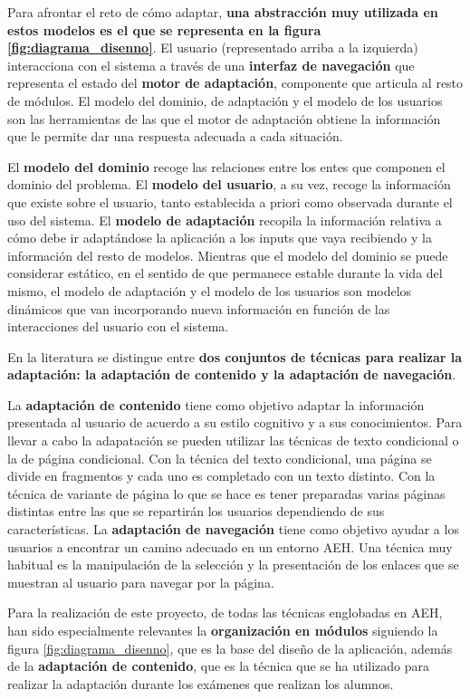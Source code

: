 Para afrontar el reto de cómo adaptar, \textbf{una abstracción muy utilizada en estos modelos es el que se representa en la figura \ref{fig:diagrama_disenno}}. El usuario (representado arriba a la izquierda) interacciona con el sistema a través de una \textbf{interfaz de navegación} que representa el estado del \textbf{motor de adaptación}, componente que articula al resto de módulos. El modelo del dominio, de adaptación y el modelo de los usuarios son las herramientas de las que el motor de adaptación obtiene la información que le permite dar una respuesta adecuada a cada situación. 

El \textbf{modelo del dominio} recoge las relaciones entre los entes que componen el dominio del problema. El \textbf{modelo del usuario}, a su vez, recoge la información que existe sobre el usuario, tanto establecida a priori como observada durante el uso del sistema. El \textbf{modelo de adaptación} recopila la información relativa a cómo debe ir adaptándose la aplicación a los inputs que vaya recibiendo y la información del resto de modelos. Mientras que el modelo del dominio se puede considerar estático, en el sentido de que permanece estable durante la vida del mismo, el modelo de adaptación y el modelo de los usuarios son modelos dinámicos que van incorporando nueva información en función de las interacciones del usuario con el sistema\cite{Benyon93}.

En la literatura se distingue entre \textbf{dos conjuntos de técnicas para realizar la adaptación: la adaptación de contenido y la adaptación de navegación}\cite{Brusilovsky98}. 

La \textbf{adaptación de contenido} tiene como objetivo adaptar la información presentada al usuario de acuerdo a su estilo cognitivo y a sus conocimientos. Para llevar a cabo la adapatación se pueden utilizar las técnicas de texto condicional o la de página condicional. Con la técnica del texto condicional, una página se divide en fragmentos y cada uno es completado con un texto distinto. Con la técnica de variante de página lo que se hace es tener preparadas varias páginas distintas entre las que se repartirán los usuarios dependiendo de sus características. La \textbf{adaptación de navegación} tiene como objetivo ayudar a los usuarios a encontrar un camino adecuado en un entorno \acrshort{AEH}. Una técnica muy habitual es la manipulación de la selección y la presentación de los enlaces que se muestran al usuario para navegar por la página\cite{Triantafillou03}.

Para la realización de este proyecto, de todas las técnicas englobadas en \acrshort{AEH}, han sido especialmente relevantes la \textbf{organización en módulos} siguiendo la figura \ref{fig:diagrama_disenno}, que es la base del diseño de la aplicación, además de la \textbf{adaptación de contenido}, que es la técnica que se ha utilizado para realizar la adaptación durante los exámenes que realizan los alumnos.


